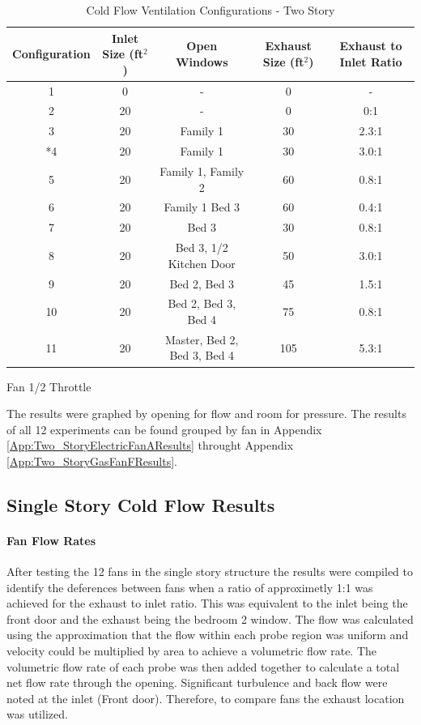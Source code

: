 \documentclass{article}
\begin{document}
\begin{table} [H]
	\caption{Cold Flow Ventilation Configurations - Two Story}
	\begin{tabular}{|c|c|c|c|c|}
		\hline
		Configuration & Inlet Size (ft$^2$) & Open Windows & Exhaust Size (ft$^2$) & Exhaust to Inlet Ratio \\ \hline \hline
		1 & 0 & - & 0 & - \\ \hline
		2 & 20 & - & 0 & 0:1 \\ \hline
		3 & 20 & Family 1 & 30 & 2.3:1 \\ \hline
		*4 & 20 & Family 1 & 30 & 3.0:1 \\ \hline
		5 & 20 & Family 1, Family 2 & 60 & 0.8:1 \\ \hline
		6 & 20 & Family 1 Bed 3 & 60 & 0.4:1 \\ \hline
		7 & 20 & Bed 3 & 30 & 0.8:1 \\ \hline
		8 & 20 & Bed 3, 1/2 Kitchen Door & 50 & 3.0:1 \\ \hline
		9 & 20 & Bed 2, Bed 3 & 45 & 1.5:1 \\ \hline
		10 & 20 & Bed 2, Bed 3, Bed 4 & 75 & 0.8:1 \\ \hline
		11 & 20 & Master, Bed 2, Bed 3, Bed 4 & 105 & 5.3:1 \\ \hline
	\end{tabular}
	\begin{tablenotes}
	\item *Fan 1/2 Throttle
	\end{tablenotes}
	\label{tab:ColdFlowConfig_TwoStory}
\end{table}

The results were graphed by opening for flow and room for pressure. The results of all 12 experiments can be found grouped by fan in Appendix \ref{App:Two_StoryElectricFanAResults} throught Appendix \ref{App:Two_StoryGasFanFResults}. 

\subsection{Single Story Cold Flow Results}

\paragraph{Fan Flow Rates} \mbox{}

After testing the 12 fans in the single story structure the results were compiled to identify the deferences between fans when a ratio of approximetly 1:1 was achieved for the exhaust to inlet ratio. This was equivalent to the inlet being the front door and the exhaust being the bedroom 2 window.  The flow was calculated using the approximation that the flow within each probe region was uniform and velocity could be multiplied by area to achieve a volumetric flow rate. The volumetric flow rate of each probe was then added together to calculate a total net flow rate through the opening. Significant turbulence and back flow were noted at the inlet (Front door). Therefore, to compare fans the exhaust location was utilized. 
\end{document}
